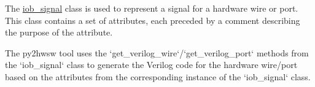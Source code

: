 %

%
%

The \href{https://github.com/IObundle/py2hwsw/blob/main/py2hwsw/scripts/iob_signal.py}{iob\_signal} class is used to represent a signal for a hardware wire or port.
This class contains a set of attributes, each preceded by a comment describing the purpose of the attribute.


%
%

The py2hwsw tool uses the `get\_verilog\_wire`/`get\_verilog\_port` methods from the `iob\_signal` class to generate the Verilog code for the hardware wire/port based on the attributes from the corresponding instance of the `iob\_signal` class.


